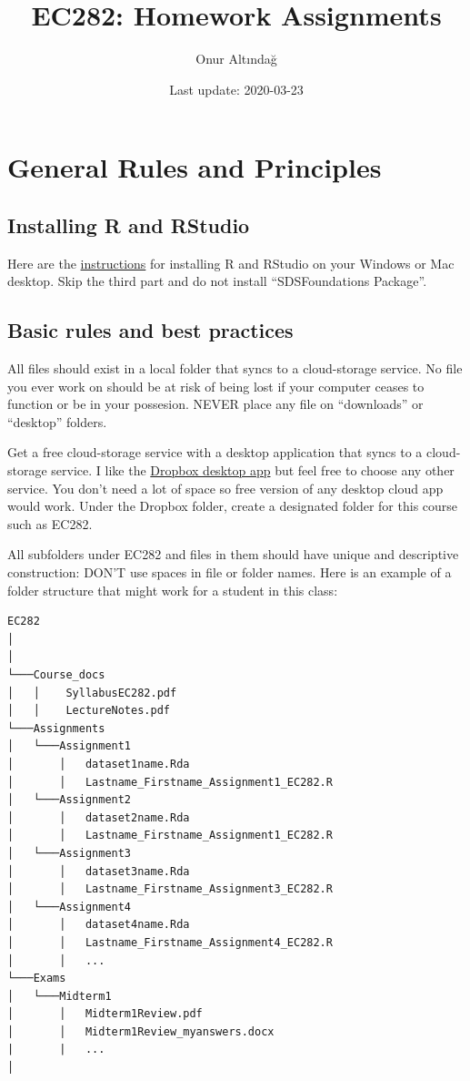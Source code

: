 \documentclass[
]{book}
\title{EC282: Homework Assignments}
\author{Onur Altındağ}
\date{Last update: 2020-03-23}
\begin{document}
\maketitle

{
\setcounter{tocdepth}{1}
\tableofcontents
}
\hypertarget{general-rules-and-principles}{%
\chapter{General Rules and Principles}\label{general-rules-and-principles}}

\hypertarget{installing-r-and-rstudio}{%
\section{Installing R and RStudio}\label{installing-r-and-rstudio}}

Here are the \href{https://courses.edx.org/courses/UTAustinX/UT.7.01x/3T2014/56c5437b88fa43cf828bff5371c6a924/}{instructions} for installing R and RStudio on your Windows or Mac desktop. Skip the third part and do not install ``SDSFoundations Package''.

\hypertarget{basic-rules-and-best-practices}{%
\section{Basic rules and best practices}\label{basic-rules-and-best-practices}}

All files should exist in a local folder that syncs to a cloud-storage service. No file you ever work on should be at risk of being lost if your computer ceases to function or be in your possesion. NEVER place any file on ``downloads'' or ``desktop'' folders.

Get a free cloud-storage service with a desktop application that syncs to a cloud-storage service. I like the \href{https://help.dropbox.com/installs-integrations/desktop/desktop-application-overview}{Dropbox desktop app} but feel free to choose any other service. You don't need a lot of space so free version of any desktop cloud app would work. Under the Dropbox folder, create a designated folder for this course such as EC282.

All subfolders under EC282 and files in them should have unique and descriptive construction: DON'T use spaces in file or folder names. Here is an example of a folder structure that might work for a student in this class:

\begin{verbatim}
EC282
│  
│
└───Course_docs
│   │    SyllabusEC282.pdf
│   │    LectureNotes.pdf 
└───Assignments
│   └───Assignment1
│       │   dataset1name.Rda
│       │   Lastname_Firstname_Assignment1_EC282.R
│   └───Assignment2
│       │   dataset2name.Rda
│       │   Lastname_Firstname_Assignment1_EC282.R
│   └───Assignment3
│       │   dataset3name.Rda
│       │   Lastname_Firstname_Assignment3_EC282.R
│   └───Assignment4
│       │   dataset4name.Rda
│       │   Lastname_Firstname_Assignment4_EC282.R
│       │   ...
└───Exams
│   └───Midterm1
│       │   Midterm1Review.pdf
│       │   Midterm1Review_myanswers.docx
|       |   ...
│   
\end{verbatim}
\end{document}
